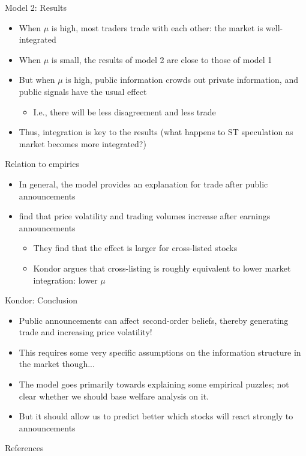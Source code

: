 \documentclass[english,10pt
,aspectratio=169
]{beamer}
\begin{document}
\begin{frame}{Model 2: Results}
	\begin{itemize}
		\item When $\mu$ is high, most traders trade with each other: the market is well-integrated
		\item When $\mu$ is small, the results of model 2 are close to those of model 1
		\item But when $\mu$ is high, public information crowds out private information, and public signals have the usual effect
		\begin{itemize}
			\item I.e., there will be less disagreement and less trade
		\end{itemize}
		\item Thus, integration is key to the results (what happens to ST speculation as market becomes more integrated?)
	\end{itemize}
\end{frame}


\begin{frame}{Relation to empirics}
	\begin{itemize}
		\item In general, the model provides an explanation for trade after public announcements
		\item \citet*{bailey_economic_2006} find that price volatility and trading volumes increase after earnings announcements
		\begin{itemize}
			\item They find that the effect is larger for cross-listed stocks
			\item Kondor argues that cross-listing is roughly equivalent to lower market integration: lower $\mu$
		\end{itemize}
	\end{itemize}
\end{frame}


\begin{frame}{Kondor: Conclusion}
	\begin{itemize}
		\item Public announcements can affect second-order beliefs, thereby generating trade and increasing price volatility!
		\item This requires some very specific assumptions on the information structure in the market though...
		\item The model goes primarily towards explaining some empirical puzzles; not clear whether we should base welfare analysis on it.
		\item But it should allow us to predict better which stocks will react strongly to announcements
	\end{itemize}
\end{frame}

\appendix
\begin{frame}[allowframebreaks]{References}
	
	
\end{frame}
\end{document}
